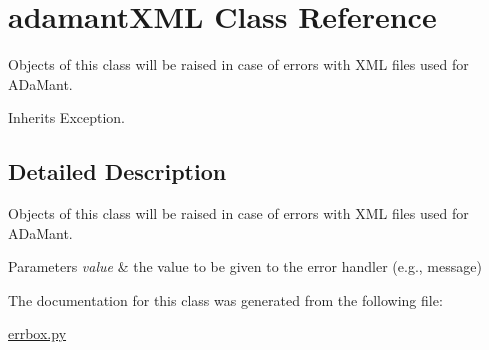 \hypertarget{classtoolbox_1_1errbox_1_1adamantXML}{\section{adamant\-X\-M\-L Class Reference}
\label{classtoolbox_1_1errbox_1_1adamantXML}
}


Objects of this class will be raised in case of errors with X\-M\-L files used for A\-Da\-Mant.  




Inherits Exception.



\subsection{Detailed Description}
Objects of this class will be raised in case of errors with X\-M\-L files used for A\-Da\-Mant. 


\begin{DoxyParams}{Parameters}
{\em value} & the value to be given to the error handler (e.\-g., message) \\
\hline
\end{DoxyParams}


The documentation for this class was generated from the following file\-:\begin{DoxyCompactItemize}
\item 
\hyperlink{errbox_8py}{errbox.\-py}\end{DoxyCompactItemize}
